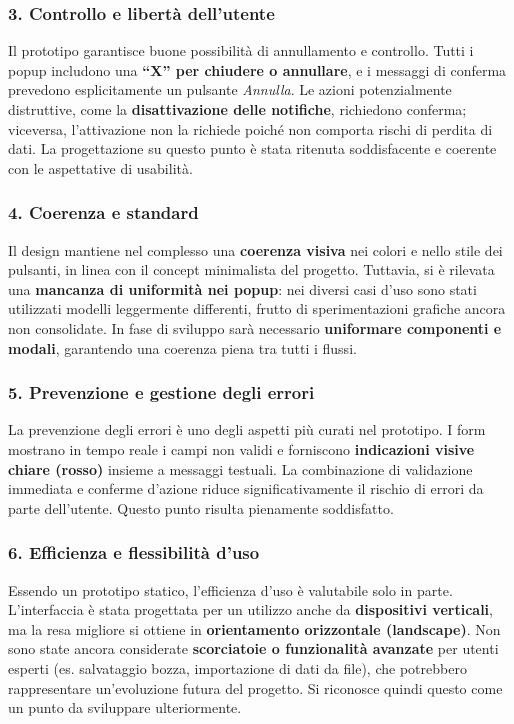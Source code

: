 \subsubsection*{3. Controllo e libertà dell’utente}  
Il prototipo garantisce buone possibilità di annullamento e controllo.  
Tutti i popup includono una \textbf{“X” per chiudere o annullare}, e i messaggi di conferma prevedono esplicitamente un pulsante \textit{Annulla}.  
Le azioni potenzialmente distruttive, come la \textbf{disattivazione delle notifiche}, richiedono conferma; viceversa, l’attivazione non la richiede poiché non comporta rischi di perdita di dati.  
La progettazione su questo punto è stata ritenuta soddisfacente e coerente con le aspettative di usabilità.

\subsubsection*{4. Coerenza e standard}  
Il design mantiene nel complesso una \textbf{coerenza visiva} nei colori e nello stile dei pulsanti, in linea con il concept minimalista del progetto.  
Tuttavia, si è rilevata una \textbf{mancanza di uniformità nei popup}: nei diversi casi d’uso sono stati utilizzati modelli leggermente differenti, frutto di sperimentazioni grafiche ancora non consolidate.  
In fase di sviluppo sarà necessario \textbf{uniformare componenti e modali}, garantendo una coerenza piena tra tutti i flussi.

\subsubsection*{5. Prevenzione e gestione degli errori}  
La prevenzione degli errori è uno degli aspetti più curati nel prototipo.  
I form mostrano in tempo reale i campi non validi e forniscono \textbf{indicazioni visive chiare (rosso)} insieme a messaggi testuali.  
La combinazione di validazione immediata e conferme d’azione riduce significativamente il rischio di errori da parte dell’utente.  
Questo punto risulta pienamente soddisfatto.

\subsubsection*{6. Efficienza e flessibilità d’uso}  
Essendo un prototipo statico, l’efficienza d’uso è valutabile solo in parte.  
L’interfaccia è stata progettata per un utilizzo anche da \textbf{dispositivi verticali}, ma la resa migliore si ottiene in \textbf{orientamento orizzontale (landscape)}.  
Non sono state ancora considerate \textbf{scorciatoie o funzionalità avanzate} per utenti esperti (es. salvataggio bozza, importazione di dati da file), che potrebbero rappresentare un’evoluzione futura del progetto.  
Si riconosce quindi questo come un punto da sviluppare ulteriormente.

